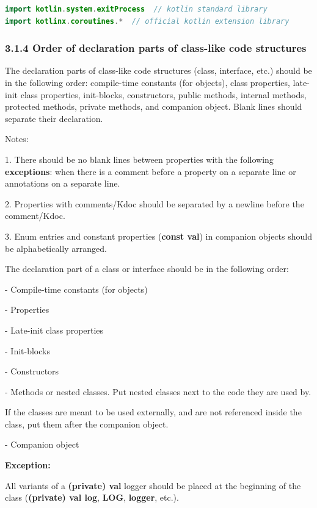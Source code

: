 {{{{{{{{{{{{{{{{\begin{lstlisting}[language=Kotlin]
import kotlin.system.exitProcess  // kotlin standard library
import kotlinx.coroutines.*  // official kotlin extension library
\end{lstlisting}


\subsubsection*{\textbf{3.1.4 Order of declaration parts of class-like code structures}}
\leavevmode\newline

\label{sec:3.1.4}

The declaration parts of class-like code structures (class, interface, etc.) should be in the following order: compile-time constants (for objects), class properties, late-init class properties, init-blocks, constructors, public methods, internal methods, protected methods, private methods, and companion object. Blank lines should separate their declaration.

Notes:

1.	There should be no blank lines between properties with the following \textbf{exceptions}: when there is a comment before a property on a separate line or annotations on a separate line.

2.	Properties with comments/Kdoc should be separated by a newline before the comment/Kdoc.

3.	Enum entries and constant properties (\textbf{const val}) in companion objects should be alphabetically arranged.



The declaration part of a class or interface should be in the following order:

- Compile-time constants (for objects)

- Properties

- Late-init class properties

- Init-blocks

- Constructors

- Methods or nested classes. Put nested classes next to the code they are used by.

If the classes are meant to be used externally, and are not referenced inside the class, put them after the companion object.

- Companion object



\textbf{Exception:}

All variants of a \textbf{(private) val} logger should be placed at the beginning of the class (\textbf{(private) val log}, \textbf{LOG}, \textbf{logger}, etc.).



}}}}}}}}}}}}}}}}
